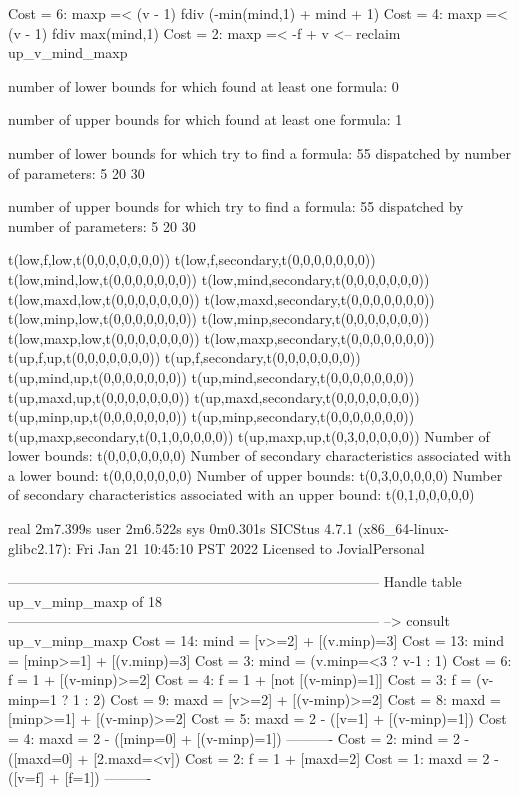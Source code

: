Cost =  6:  maxp =< (v - 1) fdiv (-min(mind,1) + mind + 1)
Cost =  4:  maxp =< (v - 1) fdiv max(mind,1)
Cost =  2:  maxp =< -f + v
<-- reclaim up_v_mind_maxp

number of lower bounds for which found at least one formula: 0

number of upper bounds for which found at least one formula: 1

number of lower bounds for which try to find a formula: 55
dispatched by number of parameters: 5  20  30

number of upper bounds for which try to find a formula: 55
dispatched by number of parameters: 5  20  30

t(low,f,low,t(0,0,0,0,0,0,0))
t(low,f,secondary,t(0,0,0,0,0,0,0))
t(low,mind,low,t(0,0,0,0,0,0,0))
t(low,mind,secondary,t(0,0,0,0,0,0,0))
t(low,maxd,low,t(0,0,0,0,0,0,0))
t(low,maxd,secondary,t(0,0,0,0,0,0,0))
t(low,minp,low,t(0,0,0,0,0,0,0))
t(low,minp,secondary,t(0,0,0,0,0,0,0))
t(low,maxp,low,t(0,0,0,0,0,0,0))
t(low,maxp,secondary,t(0,0,0,0,0,0,0))
t(up,f,up,t(0,0,0,0,0,0,0))
t(up,f,secondary,t(0,0,0,0,0,0,0))
t(up,mind,up,t(0,0,0,0,0,0,0))
t(up,mind,secondary,t(0,0,0,0,0,0,0))
t(up,maxd,up,t(0,0,0,0,0,0,0))
t(up,maxd,secondary,t(0,0,0,0,0,0,0))
t(up,minp,up,t(0,0,0,0,0,0,0))
t(up,minp,secondary,t(0,0,0,0,0,0,0))
t(up,maxp,secondary,t(0,1,0,0,0,0,0))
t(up,maxp,up,t(0,3,0,0,0,0,0))
Number of lower bounds:                                             t(0,0,0,0,0,0,0)
Number of secondary characteristics associated with a lower bound:  t(0,0,0,0,0,0,0)
Number of upper bounds:                                             t(0,3,0,0,0,0,0)
Number of secondary characteristics associated with an upper bound: t(0,1,0,0,0,0,0)

real	2m7.399s
user	2m6.522s
sys	0m0.301s
SICStus 4.7.1 (x86_64-linux-glibc2.17): Fri Jan 21 10:45:10 PST 2022
Licensed to JovialPersonal


--------------------------------------------------------------------------------
Handle table up_v_minp_maxp of 18
--------------------------------------------------------------------------------
--> consult up_v_minp_maxp
Cost = 14:  mind = [v>=2] + [(v.minp)=3]
Cost = 13:  mind = [minp>=1] + [(v.minp)=3]
Cost =  3:  mind = (v.minp=<3 ? v-1 : 1)
Cost =  6:  f    = 1 + [(v-minp)>=2]
Cost =  4:  f    = 1 + [not [(v-minp)=1]]
Cost =  3:  f    = (v-minp=1 ? 1 : 2)
Cost =  9:  maxd = [v>=2] + [(v-minp)>=2]
Cost =  8:  maxd = [minp>=1] + [(v-minp)>=2]
Cost =  5:  maxd = 2 - ([v=1] + [(v-minp)=1])
Cost =  4:  maxd = 2 - ([minp=0] + [(v-minp)=1])
----------
Cost =  2:  mind = 2 - ([maxd=0] + [2.maxd=<v])
Cost =  2:  f    = 1 + [maxd=2]
Cost =  1:  maxd = 2 - ([v=f] + [f=1])
----------

